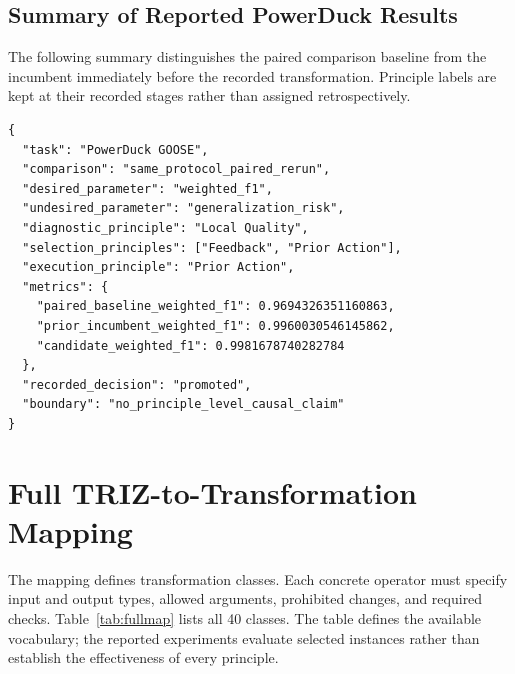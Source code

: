 \documentclass[manuscript,screen,nonacm]{acmart}
\begin{document}
\noindent\begin{minipage}{\linewidth}
\subsection{Summary of Reported PowerDuck Results}

The following summary distinguishes the paired comparison baseline from
the incumbent immediately before the recorded transformation. Principle
labels are kept at their recorded stages rather than assigned retrospectively.


\begin{verbatim}
{
  "task": "PowerDuck GOOSE",
  "comparison": "same_protocol_paired_rerun",
  "desired_parameter": "weighted_f1",
  "undesired_parameter": "generalization_risk",
  "diagnostic_principle": "Local Quality",
  "selection_principles": ["Feedback", "Prior Action"],
  "execution_principle": "Prior Action",
  "metrics": {
    "paired_baseline_weighted_f1": 0.9694326351160863,
    "prior_incumbent_weighted_f1": 0.9960030546145862,
    "candidate_weighted_f1": 0.9981678740282784
  },
  "recorded_decision": "promoted",
  "boundary": "no_principle_level_causal_claim"
}
\end{verbatim}
\end{minipage}


\section{Full TRIZ-to-Transformation Mapping}
\label{app:fullmap}

The mapping defines transformation classes. Each concrete operator must specify input and output types, allowed arguments, prohibited changes, and required checks. Table~\ref{tab:fullmap} lists all 40 classes. The table defines the available vocabulary; the reported experiments evaluate selected instances rather than establish the effectiveness of every principle.
\end{document}
